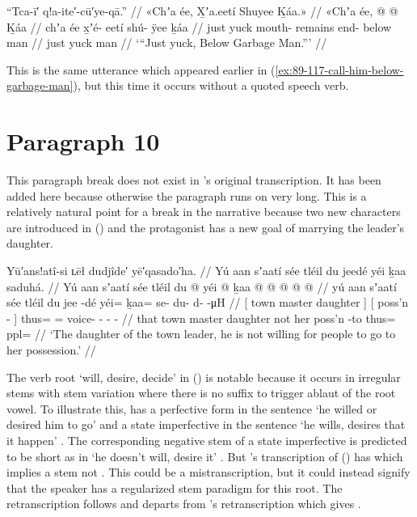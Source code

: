 \ex\label{ex:89-149-just-yuck-below-garbage-man}%
%
\begingl
	\glpreamble	“Tca-ī′ q!a-ite′-cū′ye-qā.” //
	\glpreamble	«\!Chʼa ée, X̱ʼa.eetí Shuyee Ḵáa.\!» //
	\gla	«\!Chʼa ée,  @ {}  @ {} Ḵáa //
	\glb	\pqp{}chʼa ée x̱ʼé- eetí shú- ÿee ḵáa //
	\glc	\pqp{}just yuck mouth- remains end- below man //
	\gld	\pqp{}just yuck  {}  {} man //
	\glft	‘“Just yuck, Below Garbage Man.”’
		//
\endgl
\xe

This is the same utterance which appeared earlier in (\ref{ex:89-117-call-him-below-garbage-man}), but this time it occurs without a quoted speech verb.

\section{Paragraph 10}\label{sec:89-para-10}

This paragraph break does not exist in \citeauthor{swanton:1909}’s original transcription.
It has been added here because otherwise the paragraph runs on very long.
This is a relatively natural point for a break in the narrative because two new characters are introduced in (\nextx) and the protagonist has a new goal of marrying the leader’s daughter.

\ex\label{ex:89-150-town-leader-unwilling-for-daughter}%
%
\begingl
	\glpreamble	Yū′ans!atî-si ʟēł dudjîde′ yē′qasado′ha. //
	\glpreamble	Yú aan sʼaatí sée tléil du jeedé yéi ḵaa saduhá. //
	\gla	{} Yú aan sʼaatí sée {}
		tléil {} du  @ {} {}
		yéi @ ḵaa @  @ {} @ {} @ {} @ {} //
	\glb	{} yú aan sʼaatí sée {}
		tléil {} du jee -dé {}	
		yéi= ḵaa= se- du- d-  -μH //
	\glc	{}[  town master daughter {}]
		 {}[  poss’n - {}]
		thus= = voice- - -  - //
	\gld	{} that town master daughter {}
		not {} her poss’n -to {}
		thus= ppl=  {} {} {} {} //
	\glft	‘The daughter of the town leader, he is not willing for people to go to her possession.’
		//
\endgl
\xe

The verb root  ‘will, desire, decide’ in (\lastx) is notable because it occurs in irregular stems with  stem variation where there is no suffix to trigger ablaut of the root vowel.
To illustrate this, \citeauthor{leer:1973} has a perfective form in the sentence  ‘he willed or desired him to go’ and a state imperfective in the sentence  ‘he wills, desires that it happen’ \parencite[01/44]{leer:1973}.
The corresponding negative stem of a state imperfective is predicted to be short as in  ‘he doesn’t will, desire it’ \parencite[01/44]{leer:1973}.
But \citeauthor{swanton:1909}’s transcription of (\lastx) has  which implies a stem  not .
This could be a mistranscription, but it could instead signify that the speaker has a regularized stem paradigm for this root.
The retranscription follows \citeauthor{swanton:1909} and departs from \citeauthor{leer:1977}’s retranscription which gives  \parencite[8]{leer:1977}.

